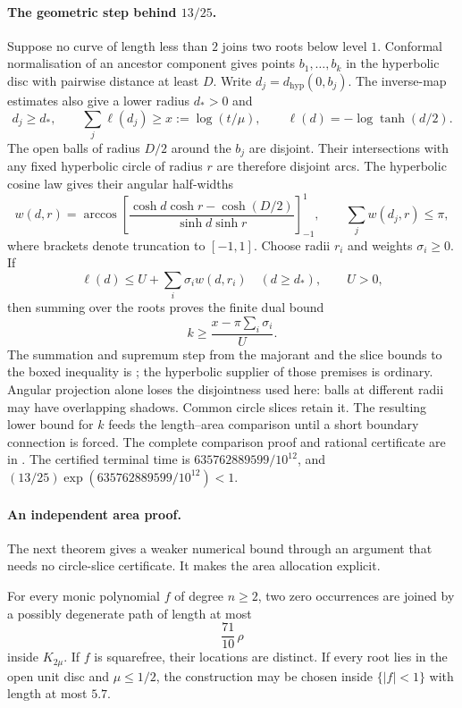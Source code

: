 \documentclass[11pt]{article}
\begin{document}
\paragraph{The geometric step behind $13/25$.}
Suppose no curve of length less than $2$ joins two roots below level $1$.
Conformal normalisation of an ancestor component gives points
$b_1,\ldots,b_k$ in the hyperbolic disc with pairwise distance at least $D$.
Write $d_j=d_{\mathrm{hyp}}(0,b_j)$.  The inverse-map estimates also give a
lower radius $d_*>0$ and
\[
 d_j\ge d_*,\qquad
 \sum_j\ell(d_j)\ge x:=\log(t/\mu),\qquad
 \ell(d)=-\log\tanh(d/2).
\]
The open balls of radius $D/2$ around the $b_j$ are disjoint.  Their
intersections with any fixed hyperbolic circle of radius $r$ are therefore
disjoint arcs.  The hyperbolic cosine law gives their angular half-widths
\[
 w(d,r)=\arccos\!\left[\frac{\cosh d\cosh r-\cosh(D/2)}
                              {\sinh d\sinh r}\right]_{-1}^{1},
 \qquad \sum_j w(d_j,r)\le\pi,
\]
where brackets denote truncation to $[-1,1]$.  Choose radii $r_i$ and weights
$\sigma_i\ge0$.  If
\[
 \ell(d)\le U+\sum_i\sigma_iw(d,r_i)\quad(d\ge d_*),\qquad U>0,
\]
then summing over the roots proves the finite dual bound
\[
 \boxed{\quad k\ge\frac{x-\pi\sum_i\sigma_i}{U}.\quad}
\]
The summation and supremum step from the majorant and the slice bounds to the
boxed inequality is
; the hyperbolic supplier of those premises is ordinary.
Angular projection alone loses the disjointness used here: balls at different
radii may have overlapping shadows.  Common circle slices retain it.
The resulting lower bound for $k$ feeds the length--area comparison until a
short boundary connection is forced.  The complete comparison proof and
rational certificate are in
.
The certified terminal time is $635762889599/10^{12}$, and
$(13/25)\exp(635762889599/10^{12})<1$.

\paragraph{An independent area proof.}
The next theorem gives a weaker numerical bound through an argument that
needs no circle-slice certificate.  It makes the area allocation explicit.

\begin{theorem}
\label{res:constant-factor-path}
For every monic polynomial $f$ of degree $n\ge2$, two zero occurrences are
joined by a possibly degenerate path of length at most
\[
 \frac{71}{10}\,\rho
\]
inside $K_{2\mu}$.  If $f$ is squarefree, their locations are distinct.
If every root lies in the open unit disc and $\mu\le1/2$, the construction
may be chosen inside $\{|f|<1\}$ with length at most $5.7$.
\end{theorem}
\end{document}
